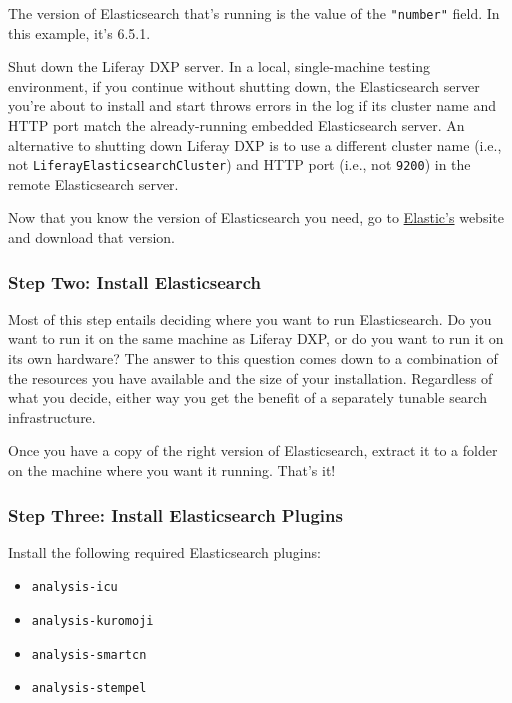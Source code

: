 The version of Elasticsearch that's running is the value of the
\texttt{"number"} field. In this example, it's 6.5.1.

Shut down the Liferay DXP server. In a local, single-machine testing
environment, if you continue without shutting down, the Elasticsearch
server you're about to install and start throws errors in the log if its
cluster name and HTTP port match the already-running embedded
Elasticsearch server. An alternative to shutting down Liferay DXP is to
use a different cluster name (i.e., not
\texttt{LiferayElasticsearchCluster}) and HTTP port (i.e., not
\texttt{9200}) in the remote Elasticsearch server.

Now that you know the version of Elasticsearch you need, go to
\href{https://www.elastic.co}{Elastic's} website and download that
version.

\subsubsection{Step Two: Install
Elasticsearch}\label{step-two-install-elasticsearch}

Most of this step entails deciding where you want to run Elasticsearch.
Do you want to run it on the same machine as Liferay DXP, or do you want
to run it on its own hardware? The answer to this question comes down to
a combination of the resources you have available and the size of your
installation. Regardless of what you decide, either way you get the
benefit of a separately tunable search infrastructure.

Once you have a copy of the right version of Elasticsearch, extract it
to a folder on the machine where you want it running. That's it!

\subsubsection{Step Three: Install Elasticsearch
Plugins}\label{step-three-install-elasticsearch-plugins}

Install the following required Elasticsearch plugins:

\begin{itemize}
\tightlist
\item
  \texttt{analysis-icu}
\item
  \texttt{analysis-kuromoji}
\item
  \texttt{analysis-smartcn}
\item
  \texttt{analysis-stempel}
\end{itemize}

